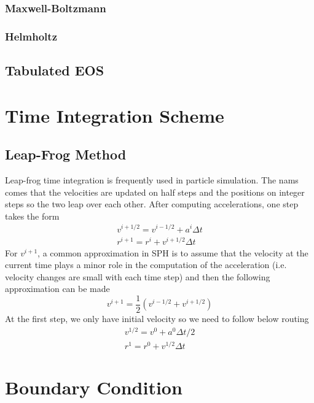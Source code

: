 \documentclass{article}
\begin{document}
\subsubsection{Maxwell-Boltzmann}
\subsubsection{Helmholtz}
\subsection{Tabulated EOS}

\section{Time Integration Scheme}
\subsection{Leap-Frog Method}
Leap-frog time integration is frequently used in particle simulation. The nams comes that the velocities are updated on half steps and the positions on integer steps so the two leap over each other. After computing accelerations, one step takes the form
\begin{align}
v^{i+1/2} = v^{i-1/2} + a^i \Delta t \\
r^{i+1} = r^i + v^{i+1/2} \Delta t
\end{align}
For $v^{i+1}$, a common approximation in SPH is to assume that the velocity at the current time plays a minor role in the computation of the acceleration (i.e. velocity changes are small with each time step) and then the following approximation can be made
\begin{equation}
v^{i+1} = \frac{1}{2} (v^{i-1/2}+v^{i+1/2})
\end{equation}
At the first step, we only have initial velocity so we need to follow below routing
\begin{align}
v^{1/2} = v^{0} + a^0 \Delta t/2 \\
r^{1} = r^0 + v^{1/2} \Delta t
\end{align}
\section{Boundary Condition}
\end{document}
